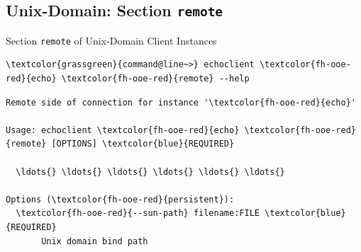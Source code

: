 \subsection{Unix-Domain: Section \textcolor{fh-ooe-red}{\lstinline|remote|}}

\begin{frame}[fragile]{Section \alert{\lstinline|remote|} of Unix-Domain Client Instances}

\begin{scriptsize}
\begin{Verbatim}[commandchars=\\\{\}]
\textcolor{grassgreen}{command@line~>} echoclient \textcolor{fh-ooe-red}{echo} \textcolor{fh-ooe-red}{remote} --help
\end{Verbatim}
\begin{Verbatim}[commandchars=\\\{\},frame=leftline,rulecolor=\color{fh-ooe-red}]
Remote side of connection for instance '\textcolor{fh-ooe-red}{echo}'

Usage: echoclient \textcolor{fh-ooe-red}{echo} \textcolor{fh-ooe-red}{remote} [OPTIONS] \textcolor{blue}{REQUIRED}

  \ldots{} \ldots{} \ldots{} \ldots{} \ldots{} \ldots{}

Options (\textcolor{fh-ooe-red}{persistent}):
  \textcolor{fh-ooe-red}{--sun-path} filename:FILE \textcolor{blue}{REQUIRED}
       Unix domain bind path
\end{Verbatim}
\end{scriptsize}
\end{frame}
